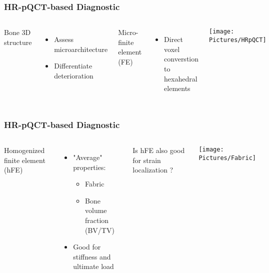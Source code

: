 \documentclass[xcolor=table,11pt]{beamer}
\begin{document}
	\begin{frame}
		\frametitle{HR-pQCT-based Diagnostic}

		\begin{columns}
			Bone 3D structure
			\begin{itemize}
				\item Assess microarchitecture
				\item Differentiate deterioration
			\end{itemize}
	
			\vspace{5mm}
	
			Micro-finite element (\si{\mu}FE)
			\begin{itemize}
				\item Direct voxel converstion to hexahedral elements
			\end{itemize}

			\centering
			\texttt{[image: Pictures/HRpQCT]}

		\end{columns}

	\end{frame}

	\begin{frame}
		\frametitle{HR-pQCT-based Diagnostic}

		\begin{columns}
			\column{0.60\linewidth}
			Homogenized finite element (hFE)
			\begin{itemize}
				\item "Average" properties:
				\begin{itemize}
					\item Fabric
					\item Bone volume fraction (BV/TV)
				\end{itemize}
				\item Good for stiffness and ultimate load
			\end{itemize}
	
			\vspace{5mm}
			Is hFE also good for strain localization ?\\\cite{p4}

			\column{0.35\linewidth}
			\texttt{[image: Pictures/Fabric]}\\
		\end{columns}
	\end{frame}


	
\end{document}
